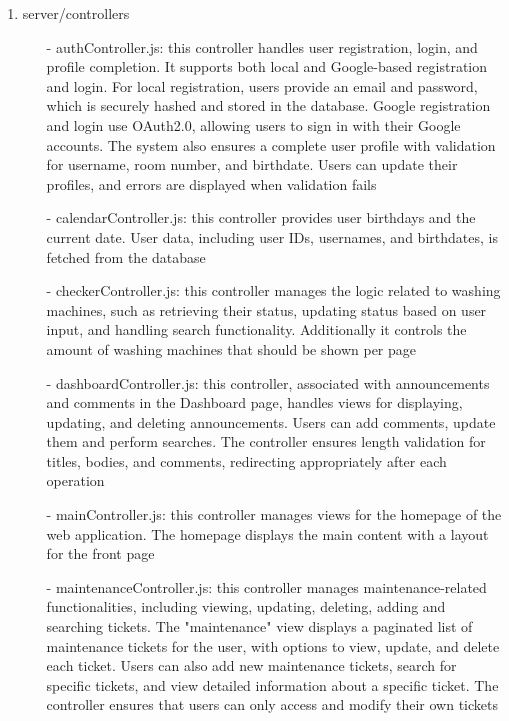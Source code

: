 \documentclass[conference]{IEEEtran}
\begin{document}
\begin{enumerate}
\begin{enumerate}
\begin{itemize}
                \end{itemize}
            \item server/controllers
                \begin{itemize}
                    \item[-] authController.js: this controller handles user registration, login, and profile completion. It supports both local and Google-based registration and login. For local registration, users provide an email and password, which is securely hashed and stored in the database. Google registration and login use OAuth2.0, allowing users to sign in with their Google accounts. The system also ensures a complete user profile with validation for username, room number, and birthdate. Users can update their profiles, and errors are displayed when validation fails
                    \item[-] calendarController.js: this controller provides user birthdays and the current date. User data, including user IDs, usernames, and birthdates, is fetched from the database
                    \item[-] checkerController.js: this controller manages the logic related to washing machines, such as retrieving their status, updating status based on user input, and handling search functionality. Additionally it controls the amount of washing machines that should be shown per page
                    \item[-] dashboardController.js: this controller, associated with announcements and comments in the Dashboard page, handles views for displaying, updating, and deleting announcements. Users can add comments, update them and perform searches. The controller ensures length validation for titles, bodies, and comments, redirecting appropriately after each operation
                    \item[-] mainController.js: this controller manages views for the homepage of the web application. The homepage displays the main content with a layout for the front page
                    \item[-] maintenanceController.js: this controller manages maintenance-related functionalities, including viewing, updating, deleting, adding and searching tickets. The "maintenance" view displays a paginated list of maintenance tickets for the user, with options to view, update, and delete each ticket. Users can also add new maintenance tickets, search for specific tickets, and view detailed information about a specific ticket. The controller ensures that users can only access and modify their own tickets

\end{itemize}
\end{enumerate}
\end{enumerate}
\end{document}
